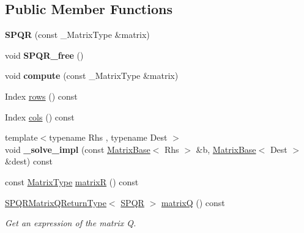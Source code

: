 \subsection*{Public Member Functions}
\begin{DoxyCompactItemize}
\item 
\mbox{\label{class_eigen_1_1_s_p_q_r_a444d838c0175e3879cf8236e59a3763e}} 
{\bfseries S\+P\+QR} (const \+\_\+\+Matrix\+Type \&matrix)
\item 
\mbox{\label{class_eigen_1_1_s_p_q_r_a79687f3c4632760f5bb3a847ebdf5b7a}} 
void {\bfseries S\+P\+Q\+R\+\_\+free} ()
\item 
\mbox{\label{class_eigen_1_1_s_p_q_r_a9fb013cddbd9e634b7174f8d2a4bca33}} 
void {\bfseries compute} (const \+\_\+\+Matrix\+Type \&matrix)
\item 
Index \mbox{\hyperlink{class_eigen_1_1_s_p_q_r_a775e28a44fd466638114edbcd17ea50a}{rows}} () const
\item 
Index \mbox{\hyperlink{class_eigen_1_1_s_p_q_r_aa006d40963b05c7525b5ca0b02364d84}{cols}} () const
\item 
\mbox{\label{class_eigen_1_1_s_p_q_r_ad95a552802fd81383bda4222b0e3924b}} 
{\footnotesize template$<$typename Rhs , typename Dest $>$ }\\void {\bfseries \+\_\+solve\+\_\+impl} (const \mbox{\hyperlink{class_eigen_1_1_matrix_base}{Matrix\+Base}}$<$ Rhs $>$ \&b, \mbox{\hyperlink{class_eigen_1_1_matrix_base}{Matrix\+Base}}$<$ Dest $>$ \&dest) const
\item 
const \mbox{\hyperlink{class_eigen_1_1_sparse_matrix}{Matrix\+Type}} \mbox{\hyperlink{class_eigen_1_1_s_p_q_r_ad51661be35674dd6a65e27699dbb3fb9}{matrixR}} () const
\item 
\mbox{\label{class_eigen_1_1_s_p_q_r_a93dbf1b487e28948e1ca2a33a35b6a54}} 
\mbox{\hyperlink{struct_eigen_1_1_s_p_q_r_matrix_q_return_type}{S\+P\+Q\+R\+Matrix\+Q\+Return\+Type}}$<$ \mbox{\hyperlink{class_eigen_1_1_s_p_q_r}{S\+P\+QR}} $>$ \mbox{\hyperlink{class_eigen_1_1_s_p_q_r_a93dbf1b487e28948e1ca2a33a35b6a54}{matrixQ}} () const
\begin{DoxyCompactList}\small\item\em Get an expression of the matrix Q. \end{DoxyCompactList}\item 

\end{DoxyCompactItemize}
